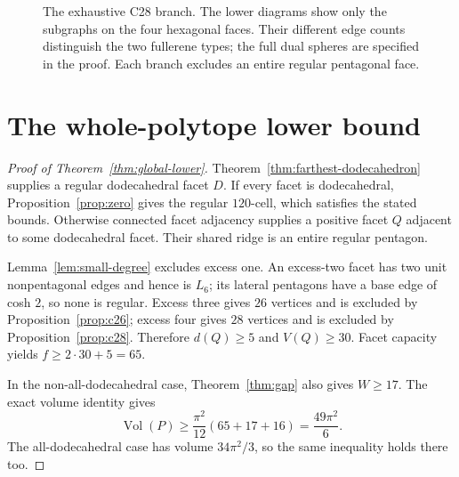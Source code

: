 \documentclass[11pt]{article}
\theoremstyle{remark}
\newcommand{\Vol}{\operatorname{Vol}}
\begin{document}
\begin{figure}[tb]
\centering
{}
\caption{The exhaustive C28 branch. The lower diagrams show only the
subgraphs on the four hexagonal faces. Their different edge counts
distinguish the two fullerene types; the full dual spheres are specified
in the proof. Each branch excludes an entire regular pentagonal face.}
\label{fig:c28-branches}
\end{figure}

\section{The whole-polytope lower bound}

\begin{proof}[Proof of Theorem~\ref{thm:global-lower}]
Theorem~\ref{thm:farthest-dodecahedron} supplies a regular dodecahedral
facet $D$. If every facet is dodecahedral, Proposition~\ref{prop:zero}
gives the regular $120$-cell, which satisfies the stated bounds.
Otherwise connected facet adjacency supplies a positive facet $Q$
adjacent to some dodecahedral facet. Their shared ridge is an entire
regular pentagon.

Lemma~\ref{lem:small-degree} excludes excess one. An excess-two facet
has two unit nonpentagonal edges and hence is $L_6$; its lateral
pentagons have a base edge of cosh $2$, so none is regular. Excess
three gives $26$ vertices and is excluded by Proposition~\ref{prop:c26};
excess four gives $28$ vertices and is excluded by
Proposition~\ref{prop:c28}. Therefore $d(Q)\ge5$ and $V(Q)\ge30$.
Facet capacity yields $f\ge2\cdot30+5=65$.

In the non-all-dodecahedral case, Theorem~\ref{thm:gap} also gives
$W\ge17$. The exact volume identity gives
\[
 \Vol(P)\ge\frac{\pi^2}{12}(65+17+16)=\frac{49\pi^2}{6}.
\]
The all-dodecahedral case has volume $34\pi^2/3$, so the same
inequality holds there too.
\end{proof}
\end{document}
